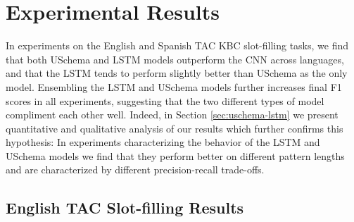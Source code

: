 \section{Experimental Results\label{sec:results}}

In experiments on the English and Spanish TAC KBC slot-filling tasks, we find that both USchema and LSTM models outperform the CNN across languages, and that the LSTM tends to perform slightly better than USchema as the only model. Ensembling the LSTM and USchema models further increases final F1 scores in all experiments, suggesting that the two different types of model compliment each other well. Indeed, in Section \ref{sec:uschema-lstm} we present quantitative and qualitative analysis of our results which further confirms this hypothesis: In experiments characterizing the behavior of the LSTM and USchema models we find that they perform better on different pattern lengths and are characterized by different precision-recall trade-offs.

\subsection {English TAC Slot-filling Results}



